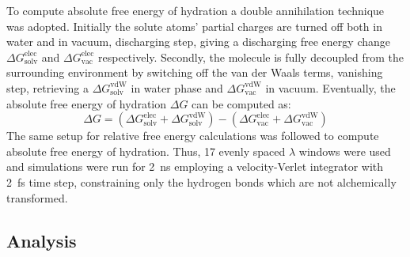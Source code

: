 \documentclass[journal=jctcce,manuscript=article]{achemso}
\begin{document}
To compute absolute free energy of hydration a double annihilation technique~\cite{jorgensen1988efficient,GILSON19971047,Bosisio2016}
was adopted. 
Initially the solute atoms' partial charges are turned off both in water and in 
vacuum, discharging step, giving a discharging
free energy change $\Delta G_\mathrm{solv}^\mathrm{elec}$ and $\Delta G_\mathrm{vac}^\mathrm{elec}$ respectively. Secondly,
the molecule is fully decoupled from the surrounding environment by switching off the van der Waals terms, vanishing step, retrieving a $\Delta G_\mathrm{solv}^\mathrm{vdW}$ in water phase and $\Delta G_\mathrm{vac}^\mathrm{vdW}$ in vacuum. 
Eventually, the absolute free energy of hydration $\Delta G$ can be computed as:
\begin{equation}
\label{eq:absolutehyd}
\Delta G = (\Delta G_\mathrm{solv}^\mathrm{elec} + \Delta G_\mathrm{solv}^\mathrm{vdW}) - (\Delta G_\mathrm{vac}^\mathrm{elec} + \Delta G_\mathrm{vac}^\mathrm{vdW})
\end{equation}
The same setup for relative free energy calculations was followed to compute absolute free energy of hydration. Thus, 17 evenly spaced $\lambda$ windows were used and simulations were run for \SI{2}{ns} employing a velocity-Verlet integrator with \SI{2}{fs} time step, constraining only the hydrogen bonds which are not alchemically transformed. 


\subsection{Analysis}
\label{sec:analysis}
\end{document}
